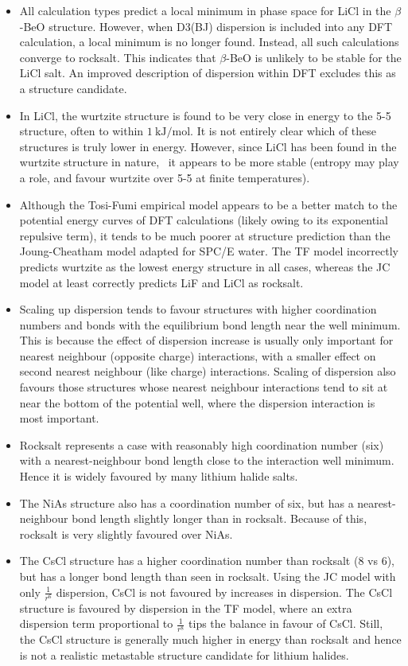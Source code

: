 \documentclass[preprint,aps,prb,floatfix]{revtex4-1}
\begin{document}
\begin{itemize}
	\item All calculation types predict a local minimum in phase space for LiCl in the $\beta$-BeO structure. However, when D3(BJ) dispersion is included into any DFT calculation, a local minimum is no longer found. Instead, all such calculations converge to rocksalt. This indicates that $\beta$-BeO is unlikely to be stable for the LiCl salt. An improved description of dispersion within DFT excludes this as a structure candidate.
	\item In LiCl, the wurtzite structure is found to be very close in energy to the 5-5 structure, often to within $\SI{1}{\kilo\joule\per\mole}$. It is not entirely clear which of these structures is truly lower in energy. However, since LiCl has been found in the wurtzite structure in nature,~\cite{bach2009synthesis} it appears to be more stable (entropy may play a role, and favour wurtzite over 5-5 at finite temperatures).
	\item Although the Tosi-Fumi empirical model appears to be a better match to the potential energy curves of DFT calculations (likely owing to its exponential repulsive term), it tends to be much poorer at structure prediction than the Joung-Cheatham model adapted for SPC/E water. The TF model incorrectly predicts wurtzite as the lowest energy structure in all cases, whereas the JC model at least correctly predicts LiF and LiCl as rocksalt.
	\item Scaling up dispersion tends to favour structures with higher coordination numbers and bonds with the equilibrium bond length near the well minimum. This is because the effect of dispersion increase is usually only important for nearest neighbour (opposite charge) interactions, with a smaller effect on second nearest neighbour (like charge) interactions. Scaling of dispersion also favours those structures whose nearest neighbour interactions tend to sit at near the bottom of the potential well, where the dispersion interaction is most important.
	\item Rocksalt represents a case with reasonably high coordination number (six) with a nearest-neighbour bond length close to the interaction well minimum. Hence it is widely favoured by many lithium halide salts.
	\item The NiAs structure also has a coordination number of six, but has a nearest-neighbour bond length slightly longer than in rocksalt. Because of this, rocksalt is very slightly favoured over NiAs.
	\item The CsCl structure has a higher coordination number than rocksalt (8 vs 6), but has a longer bond length than seen in rocksalt. Using the JC model with only $\frac{1}{r^{6}}$ dispersion, CsCl is not favoured by increases in dispersion. The CsCl structure is favoured by dispersion in the TF model, where an extra dispersion term proportional to $\frac{1}{r^{8}}$ tips the balance in favour of CsCl. Still, the CsCl structure is generally much higher in energy than rocksalt and hence is not a realistic metastable structure candidate for lithium halides.

\end{itemize}
\end{document}
